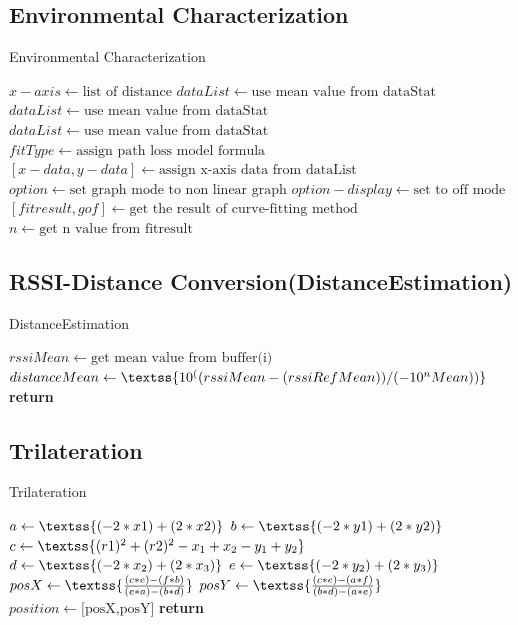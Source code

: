 \subsection{Environmental Characterization}
\begin{algorithm}
\caption{Environmental Characterization}
\begin{algorithmic}[1]
\State $x-axis\gets \text{list of distance}$
        \State $dataList \gets \text{use mean value from dataStat}$
        \State $dataList \gets \text{use mean value from dataStat}$
        \State $dataList \gets \text{use mean value from dataStat}$
    \EndIf
\State $ fitType \gets \text{assign path loss model formula}$
\State $[x-data,y-data] \gets \text{assign x-axis data from dataList}$
\State $option \gets \text{set graph mode to non linear graph}$
\State $option-display \gets \text{set to off mode}$
\State $[fitresult,gof] \gets \text{get the result of curve-fitting method}$
\State $n \gets \text{get n value from fitresult}$
\EndProcedure
\end{algorithmic}
\end{algorithm}

\subsection{RSSI-Distance Conversion(DistanceEstimation)}
\begin{algorithm}
\caption{DistanceEstimation}
\begin{algorithmic}[1]
    \State $rssiMean \gets \text{get mean value from buffer(i)}$
    \State $distanceMean \gets \newline \textss{10^((rssiMean-(rssiRefMean))/(-10^nMean))}$
\EndFor
\State \textbf{return} 
\EndProcedure
\end{algorithmic}
\end{algorithm}

\newpage
\subsection{Trilateration}
\begin{algorithm}
\caption{Trilateration}
\begin{algorithmic}[1]
\State $a\gets \textss{(-2*x1)+(2*x2)}$
\State $b\gets \textss{(-2*y1)+(2*y2)}$
\State $c\gets \textss{(r1)^2+(r2)^2-x_1+x_2-y_1+y_2}$
\State $d\gets \textss{(-2*x_2)+(2*x_3)}$
\State $e\gets \textss{(-2*y_2)+(2*y_3)}$
\State $posX \gets \textss{\frac{(c*e)-(f*b)}{(e*a)-(b*d)}}$
\State $posY \gets \textss{\frac{(c*e)-(a*f)}{(b*d)-(a*e)}}$
\State $position \gets \text{[posX,posY]}$
\State \textbf{return} 
\EndProcedure
\end{algorithmic}
\end{algorithm}

